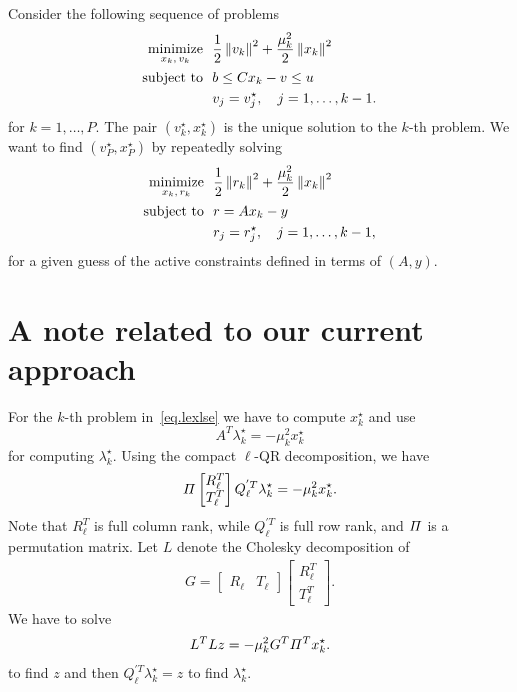\documentclass[12pt]{article}
\begin{document}
Consider the following sequence of problems
%
\begin{align}
  \begin{split}
    \mathop{\mbox{minimize}}_{x_k, \, v_k} \ \  & \frac{1}{2}\left\lVert v_k\right\rVert^2 + \frac{\mu_k^2}{2}\left\lVert x_k\right\rVert^2\\
    \mbox{subject to} \ \  & b \leq Cx_k - v \leq u \\
    & v_j = v_j^{\star}, \quad j=1,\dots,k-1.
  \end{split}
\end{align}
%
for $k=1,\dots,P$. The pair $(v_k^{\star},x_k^{\star})$ is the unique solution to the $k$-th
problem. We want to find $(v_P^{\star},x_P^{\star})$ by repeatedly solving
%
\begin{align}
  \begin{split} \label{eq.lexlse}
    \mathop{\mbox{minimize}}_{x_k, \, r_k} \ \  & \frac{1}{2}\left\lVert r_k\right\rVert^2 + \frac{\mu_k^2}{2}\left\lVert x_k\right\rVert^2\\
    \mbox{subject to} \ \  & r = Ax_k - y \\
    & r_j = r_j^{\star}, \quad j=1,\dots,k-1,
  \end{split}
\end{align}
%
for a given guess of the active constraints defined in terms of $(A,y)$.

\section{A note related to our current approach}

For the $k$-th problem in~\eqref{eq.lexlse} we have to compute $x_k^{\star}$ and use
%
\[
A^T\lambda_{k}^{\star} = -\mu_k^2x^{\star}_k
\]
%
for computing $\lambda_{k}^{\star}$. Using the compact $\ell$-QR decomposition, we have
%
\[
\mathnormal{\Pi}\begin{bmatrix}R_{\ell}^T \\ T_{\ell}^T\end{bmatrix}Q_{\ell}^{'T}\lambda_{k}^{\star} = -\mu_k^2x^{\star}_k.
\]
%
Note that $R_{\ell}^T$ is full column rank, while $Q_{\ell}^{'T}$ is full row rank, and
$\mathnormal{\Pi}$ is a permutation matrix. Let $L$ denote the Cholesky decomposition of
%
\begin{align*}
G = \begin{bmatrix}R_{\ell} & T_{\ell}\end{bmatrix}\begin{bmatrix}R_{\ell}^T \\ T_{\ell}^T\end{bmatrix}.
\end{align*}
%
We have to solve
%
\begin{align*}
  L^TLz = -\mu_k^2G^T\mathnormal{\Pi}^Tx^{\star}_k.
\end{align*}
%
to find $z$ and then $Q_{\ell}^{'T}\lambda_{k}^{\star} = z$ to find $\lambda_{k}^{\star}$.
\end{document}
